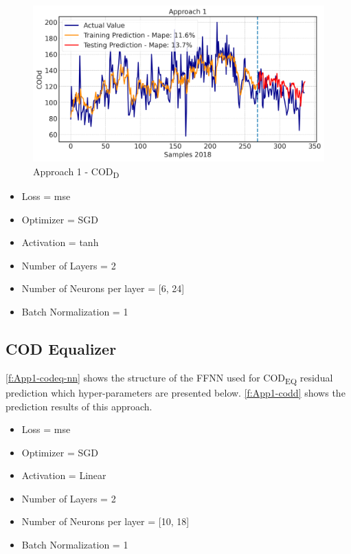\begin{figure}[hb!]
\centering
\includegraphics[width=\linewidth]{figures/Ch5/CODd-1.png}
\caption{Approach 1 - COD\textsubscript{D}}
\label{f:App1-codd}
\end{figure}

\begin{itemize}
    \item Loss = mse
    \item Optimizer = SGD
    \item Activation =  tanh
    \item Number of Layers = 2
    \item Number of Neurons per layer = [6, 24]
    \item Batch Normalization = 1
\end{itemize}

\subsection{COD Equalizer}
\autoref{f:App1-codeq-nn} shows the structure of the \ac{FFNN} used for \ac{COD}\textsubscript{EQ} residual prediction which hyper-parameters are presented below. \autoref{f:App1-codd} shows the prediction results of this approach.

\begin{itemize}
    \item Loss = mse
    \item Optimizer = SGD
    \item Activation =  Linear
    \item Number of Layers = 2
    \item Number of Neurons per layer = [10, 18]
    \item Batch Normalization = 1
\end{itemize}

